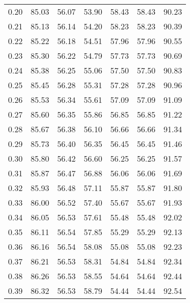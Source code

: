 \begin{tabular}{|c|c|c|c|c|c|c|}
      0.20 &     85.03 &     56.07 &      53.90 &   58.43 &      58.43 &         90.23 \\
      0.21 &     85.13 &     56.14 &      54.20 &   58.23 &      58.23 &         90.39 \\
      0.22 &     85.22 &     56.18 &      54.51 &   57.96 &      57.96 &         90.55 \\
      0.23 &     85.30 &     56.22 &      54.79 &   57.73 &      57.73 &         90.69 \\
      0.24 &     85.38 &     56.25 &      55.06 &   57.50 &      57.50 &         90.83 \\
      0.25 &     85.45 &     56.28 &      55.31 &   57.28 &      57.28 &         90.96 \\
      0.26 &     85.53 &     56.34 &      55.61 &   57.09 &      57.09 &         91.09 \\
      0.27 &     85.60 &     56.35 &      55.86 &   56.85 &      56.85 &         91.22 \\
      0.28 &     85.67 &     56.38 &      56.10 &   56.66 &      56.66 &         91.34 \\
      0.29 &     85.73 &     56.40 &      56.35 &   56.45 &      56.45 &         91.46 \\
      0.30 &     85.80 &     56.42 &      56.60 &   56.25 &      56.25 &         91.57 \\
      0.31 &     85.87 &     56.47 &      56.88 &   56.06 &      56.06 &         91.69 \\
      0.32 &     85.93 &     56.48 &      57.11 &   55.87 &      55.87 &         91.80 \\
      0.33 &     86.00 &     56.52 &      57.40 &   55.67 &      55.67 &         91.93 \\
      0.34 &     86.05 &     56.53 &      57.61 &   55.48 &      55.48 &         92.02 \\
      0.35 &     86.11 &     56.54 &      57.85 &   55.29 &      55.29 &         92.13 \\
      0.36 &     86.16 &     56.54 &      58.08 &   55.08 &      55.08 &         92.23 \\
      0.37 &     86.21 &     56.53 &      58.31 &   54.84 &      54.84 &         92.34 \\
      0.38 &     86.26 &     56.53 &      58.55 &   54.64 &      54.64 &         92.44 \\
      0.39 &     86.32 &     56.53 &      58.79 &   54.44 &      54.44 &         92.54 \\

\end{tabular}
